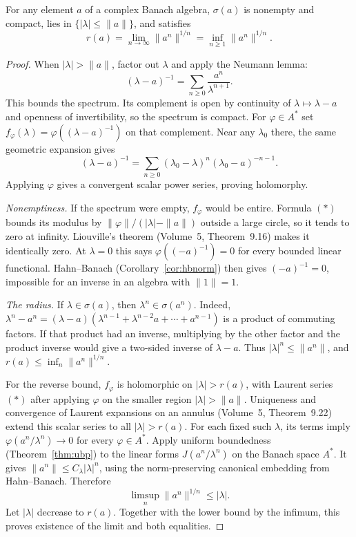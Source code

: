 \begin{theorem}[Gelfand]\label{thm:spectrum}
For any element $a$ of a complex Banach algebra, $\sigma(a)$ is nonempty and compact, lies in $\{|\lambda|\le\|a\|\}$, and satisfies
\[
r(a)=\lim_{n\to\infty}\|a^n\|^{1/n}
=\inf_{n\ge1}\|a^n\|^{1/n}.
\]
\end{theorem}
\begin{proof}
When $|\lambda|>\|a\|$, factor out $\lambda$ and apply the Neumann lemma:
\[
(\lambda-a)^{-1}=\sum_{n\ge0}\frac{a^n}{\lambda^{n+1}}.\tag{$*$}
\]
This bounds the spectrum. Its complement is open by continuity of $\lambda\mapsto\lambda-a$ and openness of invertibility, so the spectrum is compact.
For $\varphi\in A^*$ set $f_\varphi(\lambda)=\varphi((\lambda-a)^{-1})$ on that complement. Near any $\lambda_0$ there, the same geometric expansion gives
\[
(\lambda-a)^{-1}=\sum_{n\ge0}(\lambda_0-\lambda)^n(\lambda_0-a)^{-n-1}.
\]
Applying $\varphi$ gives a convergent scalar power series, proving holomorphy.

\emph{Nonemptiness.} If the spectrum were empty, $f_\varphi$ would be entire. Formula $(*)$ bounds its modulus by $\|\varphi\|/(|\lambda|-\|a\|)$ outside a large circle, so it tends to zero at infinity. Liouville's theorem (Volume~5, Theorem~9.16) makes it identically zero. At $\lambda=0$ this says $\varphi((-a)^{-1})=0$ for every bounded linear functional. Hahn--Banach (Corollary~\ref{cor:hbnorm}) then gives $(-a)^{-1}=0$, impossible for an inverse in an algebra with $\|1\|=1$.

\emph{The radius.} If $\lambda\in\sigma(a)$, then $\lambda^n\in\sigma(a^n)$. Indeed, $\lambda^n-a^n=(\lambda-a)(\lambda^{n-1}+\lambda^{n-2}a+\cdots+a^{n-1})$ is a product of commuting factors. If that product had an inverse, multiplying by the other factor and the product inverse would give a two-sided inverse of $\lambda-a$. Thus $|\lambda|^n\le\|a^n\|$, and
$r(a)\le\inf_n\|a^n\|^{1/n}$.

For the reverse bound, $f_\varphi$ is holomorphic on $|\lambda|>r(a)$, with Laurent series $(*)$ after applying $\varphi$ on the smaller region $|\lambda|>\|a\|$. Uniqueness and convergence of Laurent expansions on an annulus (Volume~5, Theorem~9.22) extend this scalar series to all $|\lambda|>r(a)$. For each fixed such $\lambda$, its terms imply $\varphi(a^n/\lambda^n)\to0$ for every $\varphi\in A^*$. Apply uniform boundedness (Theorem~\ref{thm:ubp}) to the linear forms $J(a^n/\lambda^n)$ on the Banach space $A^*$. It gives $\|a^n\|\le C_\lambda|\lambda|^n$, using the norm-preserving canonical embedding from Hahn--Banach. Therefore
\[
\limsup_n\|a^n\|^{1/n}\le|\lambda|.
\]
Let $|\lambda|$ decrease to $r(a)$. Together with the lower bound by the infimum, this proves existence of the limit and both equalities.
\end{proof}

